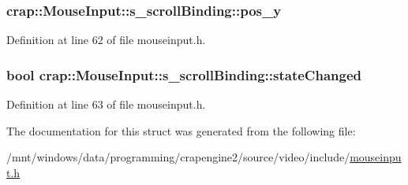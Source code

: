 \subsubsection[{pos\+\_\+y}]{ crap\+::\+Mouse\+Input\+::s\+\_\+scroll\+Binding\+::pos\+\_\+y}\label{structcrap_1_1_mouse_input_1_1s__scroll_binding_a2ae3a880b3e3eb89552c16f25a0a2a2c}


Definition at line 62 of file mouseinput.\+h.

\hypertarget{structcrap_1_1_mouse_input_1_1s__scroll_binding_acc7542a92b22f62a85d6800a08c9f2b5}{}
\subsubsection[{state\+Changed}]{\setlength{\rightskip}{0pt plus 5cm}bool crap\+::\+Mouse\+Input\+::s\+\_\+scroll\+Binding\+::state\+Changed}\label{structcrap_1_1_mouse_input_1_1s__scroll_binding_acc7542a92b22f62a85d6800a08c9f2b5}


Definition at line 63 of file mouseinput.\+h.



The documentation for this struct was generated from the following file\+:\begin{DoxyCompactItemize}
\item 
/mnt/windows/data/programming/crapengine2/source/video/include/\hyperlink{mouseinput_8h}{mouseinput.\+h}\end{DoxyCompactItemize}
